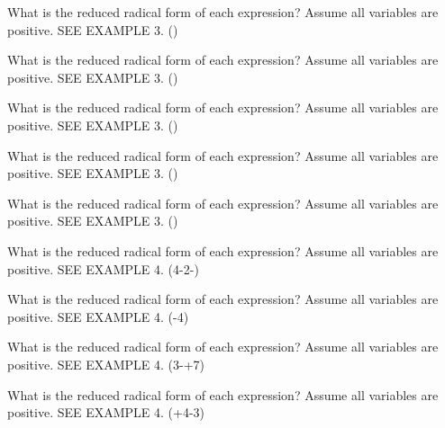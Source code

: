 \documentclass{article}
\newenvironment{practice}[2]{}{}        %
\newcommand{\answer}[1]{}               %
\newcommand{\te}[1]{}                   %
\begin{document}
\begin{practice}{32}{1}
What is the reduced radical form of each expression? Assume all variables are positive. SEE EXAMPLE 3.
()
\answer{(\frac{3\sqrt3}a)}
\end{practice}
\begin{practice}{33}{1}
What is the reduced radical form of each expression? Assume all variables are positive. SEE EXAMPLE 3.
()
\answer{(2pq\sqrt[10]{128p^7q^7})}
\end{practice}
\begin{practice}{34}{1}
What is the reduced radical form of each expression? Assume all variables are positive. SEE EXAMPLE 3.
()
\answer{(\frac{\sqrt[3]{3x^2y^2}}{3y})}
\end{practice}
\begin{practice}{35}{1}
What is the reduced radical form of each expression? Assume all variables are positive. SEE EXAMPLE 3.
(\cdot{})
\answer{(2\sqrt[3]{12})}
\end{practice}
\begin{practice}{36}{1}
What is the reduced radical form of each expression? Assume all variables are positive. SEE EXAMPLE 3.
()
\answer{(\frac{\sqrt[4]{250x^3}}{5x})}
\end{practice}
\begin{practice}{37}{1}
What is the reduced radical form of each expression? Assume all variables are positive. SEE EXAMPLE 4.
(4-2-)
\answer{(10\sqrt[3]{3}-4\sqrt[3]{9})}
\end{practice}
\begin{practice}{38}{1}
What is the reduced radical form of each expression? Assume all variables are positive. SEE EXAMPLE 4.
(-4)
\answer{(10y\sqrt5)}
\te{Printed answer is (10y\sqrt5); likely (-5y\sqrt5) for the printed subtraction expression.}
\end{practice}
\begin{practice}{39}{1}
What is the reduced radical form of each expression? Assume all variables are positive. SEE EXAMPLE 4.
(3-+7)
\answer{(41\sqrt3-3\sqrt6)}
\end{practice}
\begin{practice}{40}{1}
What is the reduced radical form of each expression? Assume all variables are positive. SEE EXAMPLE 4.
(+4-3)
\answer{(17\sqrt{2h})}
\end{practice}
\end{document}
